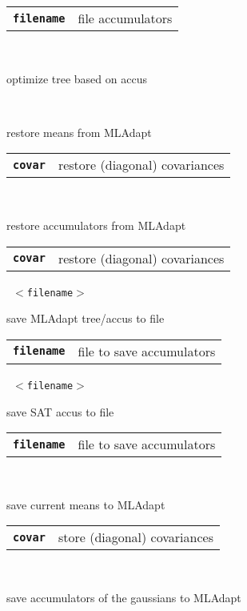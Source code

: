 \begin{description}
\begin{description}
      \begin{tabular}{ll}
 \texttt{\textbf{filename}} &  file accumulators  \\
      \end{tabular}
       \texttt{} \

        optimize tree based on accus

       \texttt{ } \

        restore means from MLAdapt

      \begin{tabular}{ll}
 \texttt{\textbf{covar}} &  restore (diagonal) covariances  \\
      \end{tabular}
       \texttt{ } \

        restore accumulators from MLAdapt

      \begin{tabular}{ll}
 \texttt{\textbf{covar}} &  restore (diagonal) covariances  \\
      \end{tabular}
       \texttt{ $<$filename$>$} \

        save MLAdapt tree/accus to file

      \begin{tabular}{ll}
 \texttt{\textbf{filename}} &  file to save accumulators  \\
      \end{tabular}
       \texttt{ $<$filename$>$} \

        save SAT accus to file

      \begin{tabular}{ll}
 \texttt{\textbf{filename}} &  file to save accumulators  \\
      \end{tabular}
       \texttt{ } \

        save current means to MLAdapt

      \begin{tabular}{ll}
 \texttt{\textbf{covar}} &  store (diagonal) covariances  \\
      \end{tabular}
       \texttt{ } \

        save accumulators of the gaussians to MLAdapt


\end{description}
\end{description}
